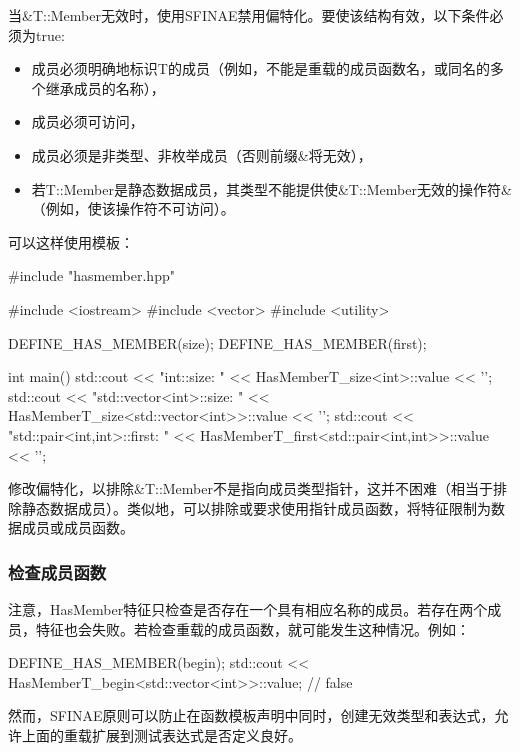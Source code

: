 当\&T::Member无效时，使用SFINAE禁用偏特化。要使该结构有效，以下条件必须为true:

\begin{itemize}
\item
成员必须明确地标识T的成员（例如，不能是重载的成员函数名，或同名的多个继承成员的名称），

\item
成员必须可访问，

\item
成员必须是非类型、非枚举成员（否则前缀\&将无效），

\item
若T::Member是静态数据成员，其类型不能提供使\&T::Member无效的操作符\&（例如，使该操作符不可访问）。
\end{itemize}

可以这样使用模板：

\begin{cpp}
#include "hasmember.hpp"

#include <iostream>
#include <vector>
#include <utility>

DEFINE_HAS_MEMBER(size);
DEFINE_HAS_MEMBER(first);

int main() {
	std::cout << "int::size: "
				<< HasMemberT_size<int>::value << '\n';
	std::cout << "std::vector<int>::size: "
				<< HasMemberT_size<std::vector<int>>::value << '\n';
	std::cout << "std::pair<int,int>::first: "
				<< HasMemberT_first<std::pair<int,int>>::value << '\n';
}
\end{cpp}

修改偏特化，以排除\&T::Member不是指向成员类型指针，这并不困难（相当于排除静态数据成员）。类似地，可以排除或要求使用指针成员函数，将特征限制为数据成员或成员函数。

\subsubsection{检查成员函数}

注意，HasMember特征只检查是否存在一个具有相应名称的成员。若存在两个成员，特征也会失败。若检查重载的成员函数，就可能发生这种情况。例如：

\begin{cpp}
DEFINE_HAS_MEMBER(begin);
std::cout << HasMemberT_begin<std::vector<int>>::value; // false
\end{cpp}

然而，SFINAE原则可以防止在函数模板声明中同时，创建无效类型和表达式，允许上面的重载扩展到测试表达式是否定义良好。

